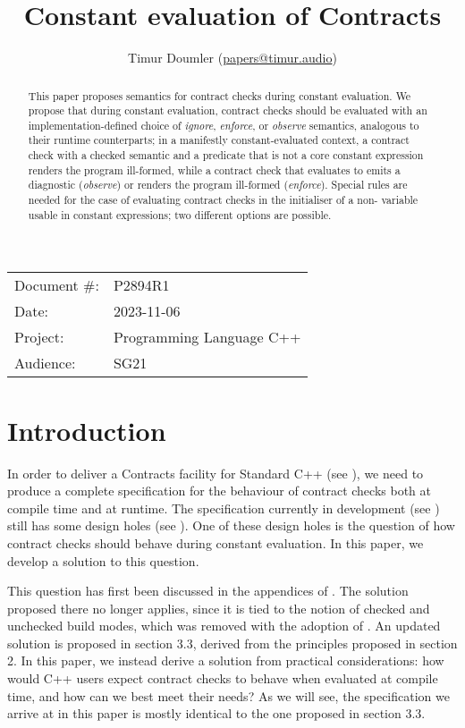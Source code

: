 


\title{Constant evaluation of Contracts}
\author{ Timur Doumler \small(\href{mailto:papers@timur.audio}{papers@timur.audio})}
\date{}
\maketitle

\begin{tabular}{ll}
Document \#: & P2894R1 \\
Date: &2023-11-06 \\
Project: & Programming Language C++ \\
Audience: & SG21
\end{tabular}

\begin{abstract}
This paper proposes semantics for contract checks during constant evaluation. We propose that during constant evaluation, contract checks should be evaluated with an implementation-defined choice of \emph{ignore}, \emph{enforce}, or \emph{observe} semantics, analogous to their runtime counterparts; in a manifestly constant-evaluated context, a contract check with a checked semantic and a predicate that is not a core constant expression renders the program ill-formed, while a contract check that evaluates to  emits a diagnostic (\emph{observe}) or renders the program ill-formed (\emph{enforce}). Special rules are needed for the case of evaluating contract checks in the initialiser of a non- variable usable in constant expressions; two different options are possible.
\end{abstract}

\section{Introduction}
\label{sec:intro}

In order to deliver a Contracts facility for Standard C++ (see \cite{P2695R1}), we need to produce a complete specification for the behaviour of contract checks both at compile time and at runtime. The specification currently in development (see \cite{P2900R1}) still has some design holes (see \cite{P2896R0}). One of these design holes is the question of how contract checks should behave during constant evaluation. In this paper, we develop a solution to this question.

This question has first been discussed in the appendices of \cite{P2834R1}. The solution proposed there no longer applies, since it is tied to the notion of checked and unchecked build modes, which was removed with the adoption of \cite{P2877R0}. An updated solution is proposed in \cite{P2932R1} section 3.3, derived from the  principles proposed in \cite{P2932R1} section 2. In this paper, we instead derive a solution from practical considerations: how would C++ users expect contract checks to behave when evaluated at compile time, and how can we best meet their needs? As we will see, the specification we arrive at in this paper is mostly identical to the one proposed in \cite{P2932R1} section 3.3.

